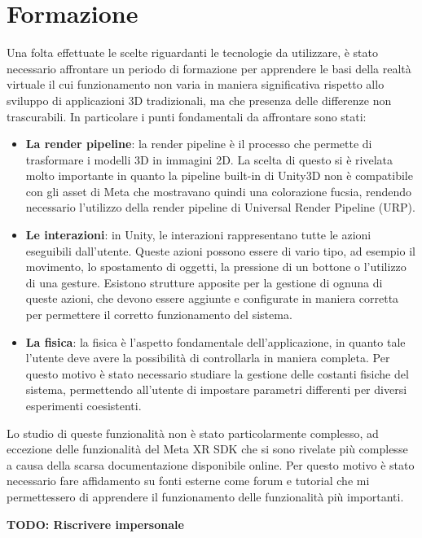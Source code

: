 \section{Formazione}
\label{sec:formazione}

Una folta effettuate le scelte riguardanti le tecnologie da utilizzare, è stato
necessario affrontare un periodo di formazione per apprendere le basi della
realtà virtuale il cui funzionamento non varia in maniera significativa rispetto
allo sviluppo di applicazioni 3D tradizionali, ma che presenza delle differenze non
trascurabili. In particolare i punti fondamentali da affrontare sono stati:
\begin{itemize}
  \item \textbf{La render pipeline}: la render pipeline è il processo che permette
    di trasformare i modelli 3D in immagini 2D. La scelta di questo si è
    rivelata molto importante in quanto la pipeline built-in di Unity3D non è
    compatibile con gli asset di Meta che mostravano quindi una colorazione
    fucsia, rendendo necessario l'utilizzo della render pipeline di Universal Render
    Pipeline (URP).

  \item \textbf{Le interazioni}: in Unity, le interazioni rappresentano tutte le
    azioni eseguibili dall'utente. Queste azioni possono essere di vario tipo,
    ad esempio il movimento, lo spostamento di oggetti, la pressione di un
    bottone o l'utilizzo di una gesture. Esistono strutture apposite per la gestione
    di ognuna di queste azioni, che devono essere aggiunte e configurate in
    maniera corretta per permettere il corretto funzionamento del sistema.

  \item \textbf{La fisica}: la fisica è l'aspetto fondamentale dell'applicazione,
    in quanto tale l'utente deve avere la possibilità di controllarla in maniera
    completa. Per questo motivo è stato necessario studiare la gestione delle costanti
    fisiche del sistema, permettendo all'utente di impostare parametri
    differenti per diversi esperimenti coesistenti.
\end{itemize}

Lo studio di queste funzionalità non è stato particolarmente complesso, ad eccezione
delle funzionalità del Meta XR SDK che si sono rivelate più complesse a causa della
scarsa documentazione disponibile online. Per questo motivo è stato necessario
fare affidamento su fonti esterne come forum e tutorial che mi permettessero di
apprendere il funzionamento delle funzionalità più importanti.

\textbf{TODO: Riscrivere impersonale}